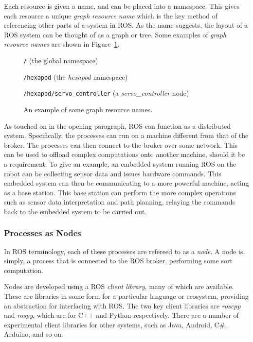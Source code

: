 \documentclass{l4proj}
\begin{document}
Each resource is given a name, and can be placed into a namespace. This gives each resource a unique \emph{graph resource name} which is the key method of referencing other parts of a system in ROS. As the name suggests, the layout of a ROS system can be thought of as a graph or tree. Some examples of \emph{graph resource names} are shown in Figure~\ref{fig:graph_resource_names}.

\begin{figure}[h!]
    \centering

    \texttt{/} (the global namespace)

    \texttt{/hexapod} (the \emph{hexapod} namespace)

    \texttt{/hexapod/servo\_controller} (a \emph{servo\_controller} node)

    \caption{An example of some graph resource names.}
    \label{fig:graph_resource_names}
\end{figure}

As touched on in the opening paragraph, ROS can function as a distributed system. Specifically, the processes can run on a machine different from that of the broker. The processes can then connect to the broker over some network. This can be used to offload complex computations onto another machine, should it be a requirement. To give an example, an embedded system running ROS on the robot can be collecting sensor data and issues hardware commands. This embedded system can then be communicating to a more powerful machine, acting as a base station. This base station can perform the more complex operations such as sensor data interpretation and path planning, relaying the commands back to the embedded system to be carried out.

\subsubsection{Processes as Nodes}
In ROS terminology, each of these processes are refereed to as a \emph{node}. A node is, simply, a process that is connected to the ROS broker, performing some sort computation.

Nodes are developed using a ROS \emph{client library}, many of which are available. These are libraries in some form for a particular language or ecosystem, providing an abstraction for interfacing with ROS. The two key client libraries are \emph{roscpp} and \emph{rospy}, which are for C++ and Python respectively. There are a number of experimental client libraries for other systems, such as Java, Android, C\#, Arduino, and so on.
\end{document}
